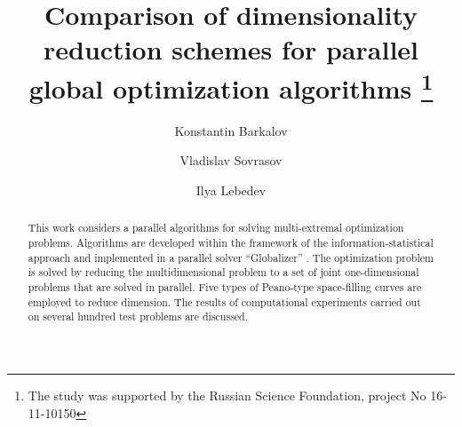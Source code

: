 \documentclass[runningheads]{llncs}
\begin{document}
\setlength{\abovedisplayskip}{3pt}
\setlength{\belowdisplayskip}{3pt}
%
\title{Comparison of dimensionality reduction schemes for parallel global optimization algorithms
\thanks{The study was supported by the Russian Science Foundation, project No 16-11-10150}}
%
%
\author{Konstantin Barkalov \and
Vladislav Sovrasov \and
Ilya Lebedev}
%
%
%
\maketitle              %
%
\begin{abstract}
This work considers a parallel algorithms for solving multi-extremal optimization problems. Algorithms are developed within the framework of the information-statistical approach and implemented in a parallel solver “Globalizer” . The optimization problem is solved by reducing the multidimensional problem to a set of joint one-dimensional problems that are solved in parallel. Five types of Peano-type space-filling curves are employed to reduce dimension. The results of computational experiments carried out on several hundred test problems are discussed.

\end{abstract}

\end{document}
